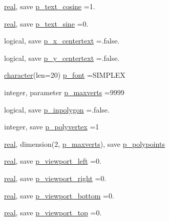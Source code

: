 \begin{DoxyCompactItemize}
\item 
\hyperlink{read__watch_83_8txt_abdb62bde002f38ef75f810d3a905a823}{real}, save \hyperlink{namespacem__pixel_a85337ee8045620104d3dc7c63cc0cbdb}{p\+\_\+text\+\_\+cosine} =1.
\item 
\hyperlink{read__watch_83_8txt_abdb62bde002f38ef75f810d3a905a823}{real}, save \hyperlink{namespacem__pixel_afa488842d93c6af90f0acc87f36c8a84}{p\+\_\+text\+\_\+sine} =0.
\item 
logical, save \hyperlink{namespacem__pixel_afbac34f0dc57e0da0666b52c238ea37c}{p\+\_\+x\+\_\+centertext} =.false.
\item 
logical, save \hyperlink{namespacem__pixel_a7f2859a8ac00324dff9d055b83bd17d2}{p\+\_\+y\+\_\+centertext} =.false.
\item 
\hyperlink{option__stopwatch_83_8txt_abd4b21fbbd175834027b5224bfe97e66}{character}(len=20) \hyperlink{namespacem__pixel_a06bbf83bc5125cad5aba0af267af0e18}{p\+\_\+font} =\textquotesingle{}S\+I\+M\+P\+L\+EX\textquotesingle{}
\item 
integer, parameter \hyperlink{namespacem__pixel_ac1b53fdfda87eb9ede10e72973344e25}{p\+\_\+maxverts} =9999
\item 
logical, save \hyperlink{namespacem__pixel_a1911f94cdfa5a7c08ff32a696d2ea51e}{p\+\_\+inpolygon} =.false.
\item 
integer, save \hyperlink{namespacem__pixel_ac0759567a2205be55bc4c9b8b7b6d5d5}{p\+\_\+polyvertex} =1
\item 
\hyperlink{read__watch_83_8txt_abdb62bde002f38ef75f810d3a905a823}{real}, dimension(2, \hyperlink{namespacem__pixel_ac1b53fdfda87eb9ede10e72973344e25}{p\+\_\+maxverts}), save \hyperlink{namespacem__pixel_ab5c7f104a86e11630f363a26a1cb7067}{p\+\_\+polypoints}
\item 
\hyperlink{read__watch_83_8txt_abdb62bde002f38ef75f810d3a905a823}{real}, save \hyperlink{namespacem__pixel_aa5806ca65801efd8c0e6753be81847d6}{p\+\_\+viewport\+\_\+left} =0.
\item 
\hyperlink{read__watch_83_8txt_abdb62bde002f38ef75f810d3a905a823}{real}, save \hyperlink{namespacem__pixel_a85587aae427d1f08e1f835dc6756b121}{p\+\_\+viewport\+\_\+right} =0.
\item 
\hyperlink{read__watch_83_8txt_abdb62bde002f38ef75f810d3a905a823}{real}, save \hyperlink{namespacem__pixel_a1bcd9c34bcf4869912b4267964b5e92d}{p\+\_\+viewport\+\_\+bottom} =0.
\item 
\hyperlink{read__watch_83_8txt_abdb62bde002f38ef75f810d3a905a823}{real}, save \hyperlink{namespacem__pixel_a127bd1570b649951e9f064c65e71945c}{p\+\_\+viewport\+\_\+top} =0.

\end{DoxyCompactItemize}
